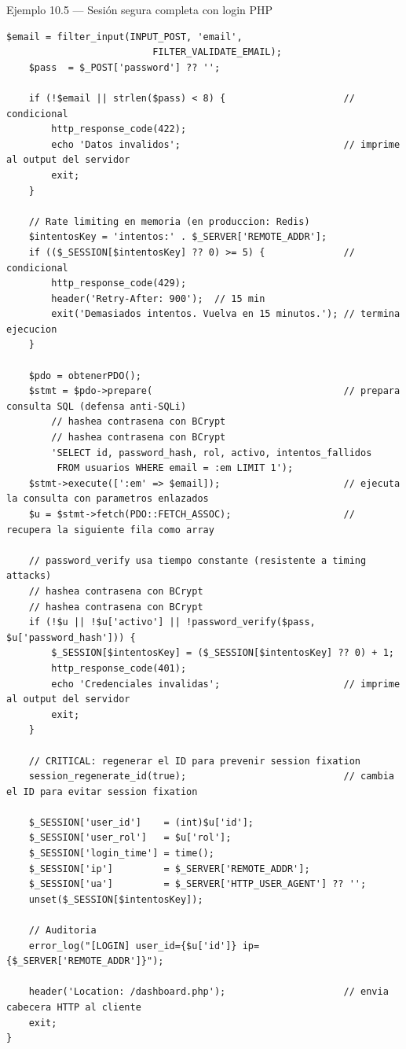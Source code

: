 \documentclass[11pt,a4paper,openany]{book}
\begin{document}
\begin{cajaejemplo}{Ejemplo 10.5 --- Sesión segura completa con login PHP}
\begin{lstlisting}[style=php,caption={login.php con todas las prácticas},label=lst:10.12]
    $email = filter_input(INPUT_POST, 'email',
                          FILTER_VALIDATE_EMAIL);
    $pass  = $_POST['password'] ?? '';

    if (!$email || strlen($pass) < 8) {                     // condicional
        http_response_code(422);
        echo 'Datos invalidos';                             // imprime al output del servidor
        exit;
    }

    // Rate limiting en memoria (en produccion: Redis)
    $intentosKey = 'intentos:' . $_SERVER['REMOTE_ADDR'];
    if (($_SESSION[$intentosKey] ?? 0) >= 5) {              // condicional
        http_response_code(429);
        header('Retry-After: 900');  // 15 min
        exit('Demasiados intentos. Vuelva en 15 minutos.'); // termina ejecucion
    }

    $pdo = obtenerPDO();
    $stmt = $pdo->prepare(                                  // prepara consulta SQL (defensa anti-SQLi)
        // hashea contrasena con BCrypt
        // hashea contrasena con BCrypt
        'SELECT id, password_hash, rol, activo, intentos_fallidos
         FROM usuarios WHERE email = :em LIMIT 1');
    $stmt->execute([':em' => $email]);                      // ejecuta la consulta con parametros enlazados
    $u = $stmt->fetch(PDO::FETCH_ASSOC);                    // recupera la siguiente fila como array

    // password_verify usa tiempo constante (resistente a timing attacks)
    // hashea contrasena con BCrypt
    // hashea contrasena con BCrypt
    if (!$u || !$u['activo'] || !password_verify($pass, $u['password_hash'])) {
        $_SESSION[$intentosKey] = ($_SESSION[$intentosKey] ?? 0) + 1;
        http_response_code(401);
        echo 'Credenciales invalidas';                      // imprime al output del servidor
        exit;
    }

    // CRITICAL: regenerar el ID para prevenir session fixation
    session_regenerate_id(true);                            // cambia el ID para evitar session fixation

    $_SESSION['user_id']    = (int)$u['id'];
    $_SESSION['user_rol']   = $u['rol'];
    $_SESSION['login_time'] = time();
    $_SESSION['ip']         = $_SERVER['REMOTE_ADDR'];
    $_SESSION['ua']         = $_SERVER['HTTP_USER_AGENT'] ?? '';
    unset($_SESSION[$intentosKey]);

    // Auditoria
    error_log("[LOGIN] user_id={$u['id']} ip={$_SERVER['REMOTE_ADDR']}");

    header('Location: /dashboard.php');                     // envia cabecera HTTP al cliente
    exit;
}


\end{lstlisting}
\end{cajaejemplo}
\end{document}
